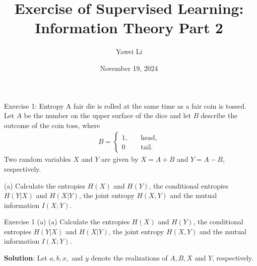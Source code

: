 \documentclass[aspectratio=169]{beamer}
\title[]{\textbf{Exercise of Supervised Learning:\\Information Theory Part 2}}
\author{Yawei Li}
\institute[LMU]
{
\\
  \texttt{yawei.li@stat.uni-muenchen.de}
}
\date{November 19, 2024}
\begin{document}
\begin{frame}
\titlepage

\end{frame}

\begin{frame}{Exercise 1: Entropy}
	A fair die is rolled at the same time as a fair coin is tossed. Let $A$ be the number on the upper surface of the dice and let $B$ describe the outcome of the coin toss, where 
	\begin{align*}
		B = \begin{cases}
			1, \quad & \text{head,} \\
			0 \quad & \text{tail.}
		\end{cases}
	\end{align*}
	Two random variables $X$ and $Y$ are given by $X = A + B$ and $Y = A - B$, respectively.
	\vspace{10pt}
	
	(a) Calculate the entropies $H(X)$ and $H(Y)$, the conditional entropies $H(Y|X)$ and $H(X|Y)$, the joint entropy $H(X, Y)$ and the mutual information $I(X;Y)$.
\end{frame}

\begin{frame}{Exercise 1 (a)}
(a) Calculate the entropies $H(X)$ and $H(Y)$, the conditional entropies $H(Y|X)$ and $H(X|Y)$, the joint entropy $H(X, Y)$ and the mutual information $I(X;Y)$.

\textbf{Solution}: Let $a, b, x,$ and $y$ denote the realizations of $A, B, X$ and $Y$, respectively.





\end{frame}
\end{document}
